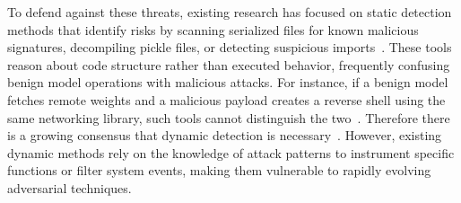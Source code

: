 
To defend against these threats, existing research has focused on static detection methods that identify risks by scanning serialized files for known malicious signatures, decompiling pickle files, or detecting suspicious imports~\cite{modelscan,fickling,picklescanning}. These tools reason about code structure rather than executed behavior, frequently confusing benign model operations with malicious attacks. For instance, if a benign model fetches remote weights and a malicious payload creates a reverse shell using the same networking library, such tools cannot distinguish the two~\cite{nabeel2026deepdiveabusedl}. Therefore there is a growing consensus that dynamic detection is necessary~\cite{10068497,10100797898195307244}. However, existing dynamic methods rely on the knowledge of attack patterns to instrument specific functions or filter system events, making them vulnerable to rapidly evolving adversarial techniques. 

